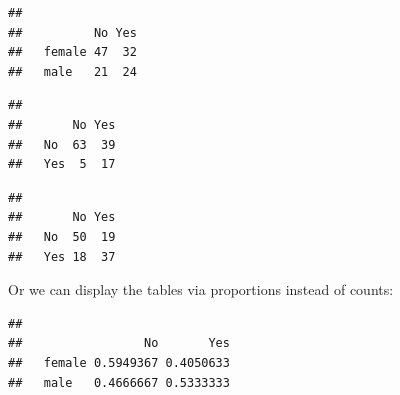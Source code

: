 \documentclass[
]{book}
\newenvironment{Shaded}{\begin{snugshade}}{\end{snugshade}}
\newcommand{\DecValTok}[1]{\textcolor[rgb]{0.00,0.00,0.81}{#1}}
\newcommand{\DocumentationTok}[1]{\textcolor[rgb]{0.56,0.35,0.01}{\textbf{\textit{#1}}}}
\newcommand{\FunctionTok}[1]{\textcolor[rgb]{0.13,0.29,0.53}{\textbf{#1}}}
\newcommand{\NormalTok}[1]{#1}
\newcommand{\SpecialCharTok}[1]{\textcolor[rgb]{0.81,0.36,0.00}{\textbf{#1}}}
\begin{document}
\begin{verbatim}
##         
##          No Yes
##   female 47  32
##   male   21  24
\end{verbatim}

\begin{Shaded}
\end{Shaded}

\begin{verbatim}
##      
##       No Yes
##   No  63  39
##   Yes  5  17
\end{verbatim}

\begin{Shaded}
\end{Shaded}

\begin{verbatim}
##      
##       No Yes
##   No  50  19
##   Yes 18  37
\end{verbatim}

Or we can display the tables via proportions instead of counts:

\begin{Shaded}
\end{Shaded}

\begin{verbatim}
##         
##                 No       Yes
##   female 0.5949367 0.4050633
##   male   0.4666667 0.5333333
\end{verbatim}

\begin{Shaded}
\end{Shaded}
\end{document}
